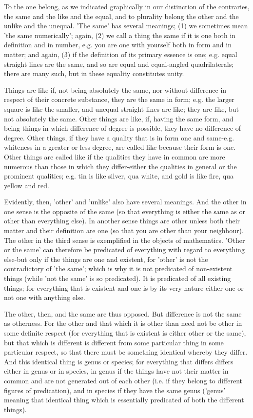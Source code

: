 To the one belong, as we indicated graphically in our distinction of the contraries, the same and the like and the equal, and to plurality belong the other and the unlike and the unequal. 'The same' has several meanings; (1) we sometimes mean 'the same numerically'; again, (2) we call a thing the same if it is one both in definition and in number, e.g. you are one with yourself both in form and in matter; and again, (3) if the definition of its primary essence is one; e.g. equal straight lines are the same, and so are equal and equal-angled quadrilaterals; there are many such, but in these equality constitutes unity.

Things are like if, not being absolutely the same, nor without difference in respect of their concrete substance, they are the same in form; e.g. the larger square is like the smaller, and unequal straight lines are like; they are like, but not absolutely the same. Other things are like, if, having the same form, and being things in which difference of degree is possible, they have no difference of degree. Other things, if they have a quality that is in form one and same-e.g. whiteness-in a greater or less degree, are called like because their form is one. Other things are called like if the qualities they have in common are more numerous than those in which they differ-either the qualities in general or the prominent qualities; e.g. tin is like silver, qua white, and gold is like fire, qua yellow and red.

Evidently, then, 'other' and 'unlike' also have several meanings. And the other in one sense is the opposite of the same (so that everything is either the same as or other than everything else). In another sense things are other unless both their matter and their definition are one (so that you are other than your neighbour). The other in the third sense is exemplified in the objects of mathematics. 'Other or the same' can therefore be predicated of everything with regard to everything else-but only if the things are one and existent, for 'other' is not the contradictory of 'the same'; which is why it is not predicated of non-existent things (while 'not the same' is so predicated). It is predicated of all existing things; for everything that is existent and one is by its very nature either one or not one with anything else.

The other, then, and the same are thus opposed. But difference is not the same as otherness. For the other and that which it is other than need not be other in some definite respect (for everything that is existent is either other or the same), but that which is different is different from some particular thing in some particular respect, so that there must be something identical whereby they differ. And this identical thing is genus or species; for everything that differs differs either in genus or in species, in genus if the things have not their matter in common and are not generated out of each other (i.e. if they belong to different figures of predication), and in species if they have the same genus ('genus' meaning that identical thing which is essentially predicated of both the different things).

